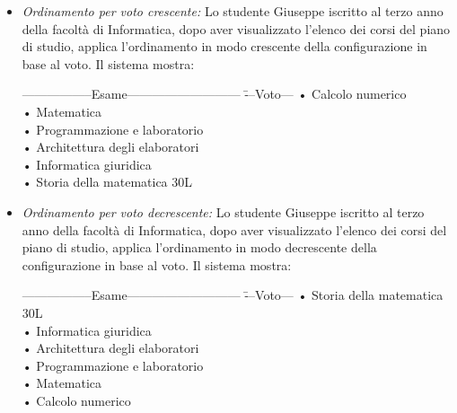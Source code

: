 \begin{itemize}
	\item \textit{Ordinamento per voto crescente:}
	Lo studente Giuseppe iscritto al terzo anno della facoltà di Informatica, dopo aver visualizzato l'elenco dei corsi del piano di studio, applica l'ordinamento in modo crescente della configurazione in base al voto. Il sistema mostra:
	\begin{tabbing}
		\hspace{1cm}-----------------Esame--------------------------- \= ---Voto--- \kill
		\hspace{1cm} • Calcolo numerico \\
		\hspace{1cm} • Matematica   \\
		\hspace{1cm} • Programmazione e laboratorio \\
		\hspace{1cm} • Architettura degli elaboratori \\
		\hspace{1cm} • Informatica giuridica \\
		\hspace{1cm} • Storia della matematica \> 30L\\
	\end{tabbing}
	
	\item \textit{Ordinamento per voto decrescente:}
	Lo studente Giuseppe iscritto al terzo anno della facoltà di Informatica, dopo aver visualizzato l'elenco dei corsi del piano di studio, applica l'ordinamento in modo decrescente della configurazione in base al voto. Il sistema mostra:
	\begin{tabbing}
		\hspace{1cm}-----------------Esame--------------------------- \= ---Voto--- \kill
		\hspace{1cm} • Storia della matematica \> 30L\\
		\hspace{1cm} • Informatica giuridica \> 30\\
		\hspace{1cm} • Architettura degli elaboratori \> 28\\
		\hspace{1cm} • Programmazione e laboratorio \> 25\\
		\hspace{1cm} • Matematica \>24\\
		\hspace{1cm} • Calcolo numerico \> 18\\
	\end{tabbing}
	

\end{itemize}
